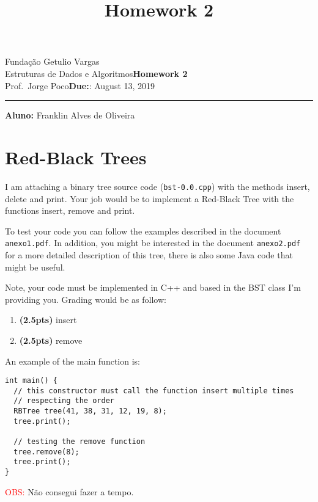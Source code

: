\documentclass{article}
\title{Homework 2}
\date{}
\newcommand{\assignment}{Homework 2}
\newcommand{\duedate}{August 13, 2019}
\begin{document}
Fundação Getulio Vargas\hfill\\
Estruturas de Dados e Algoritmos\hfill\textbf{\assignment}\\
Prof.\ Jorge Poco\hfill\textbf{Due:}: \duedate\\
\smallskip\hrule\bigskip

\textbf{Aluno:} Franklin Alves de Oliveira
{\let\newpage\relax\maketitle}

\maketitle


\section{Red-Black Trees}

I am attaching a binary tree source code (\texttt{bst-0.0.cpp}) with the methods insert, delete and print. Your job would be to implement a Red-Black Tree with the functions insert, remove and print. 

To test your code you can follow the examples described in the document \texttt{anexo1.pdf}. In addition, you might be interested in the document \texttt{anexo2.pdf} for a more detailed description of this tree, there is also some Java code that might be useful. 

Note, your code must be implemented in C++ and based in the BST class I'm providing you. Grading would be as follow:

\begin{enumerate}[label=(\alph*)]
  \item \textbf{(2.5pts)} insert 
  \item \textbf{(2.5pts)} remove 
\end{enumerate}

An example of the main function is: 

\begin{lstlisting}
int main() {
  // this constructor must call the function insert multiple times 
  // respecting the order
  RBTree tree(41, 38, 31, 12, 19, 8);
  tree.print();

  // testing the remove function
  tree.remove(8);
  tree.print();
}
\end{lstlisting}

\textcolor{red}{OBS:} Não consegui fazer a tempo. 
\end{document}
